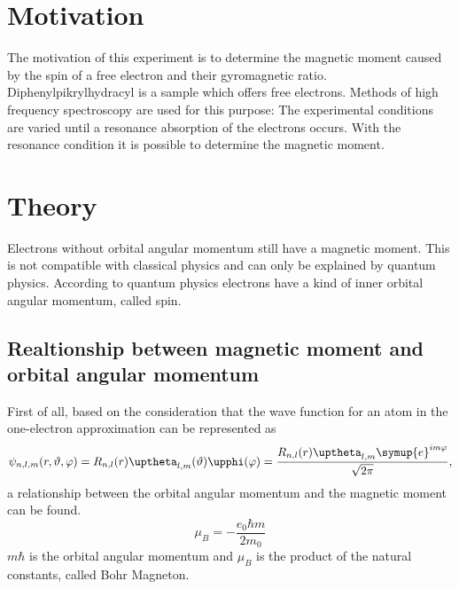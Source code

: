 \section{Motivation}
The motivation of this experiment is to determine the magnetic moment caused by the spin of a free electron and their gyromagnetic ratio.
Diphenylpikrylhydracyl is a sample which offers free electrons. Methods of high frequency spectroscopy are used for this purpose:
The experimental conditions are varied until a resonance absorption of the electrons occurs. With the resonance condition it is possible
to determine the magnetic moment.
\section{Theory}
Electrons without orbital angular momentum still have a magnetic moment. This is not compatible with classical physics
and can only be explained by quantum physics.
According to quantum physics electrons have a kind of inner orbital angular momentum, called spin. \\
\subsection{Realtionship between magnetic moment and orbital angular momentum}
First of all, based on the consideration that the
wave function for an atom in the one-electron approximation can be represented as
\begin{equation}
  \psi_{n,l,m}(r,\vartheta,\varphi)=R_{n,l}(r)\uptheta_{l,m}(\vartheta)\upphi(\varphi)=\frac{R_{n,l}(r)\uptheta_{l,m}\symup{e}^{im\varphi}}{\sqrt{2\pi}},
\end{equation}
a relationship between the orbital angular momentum
and the magnetic moment can be found.
\begin{equation}
  \mu_B=-\frac{e_0\hbar m}{2m_0}
\end{equation}
$m\hbar$ is the orbital angular momentum and $\mu_B$ is the product of the natural constants, called Bohr Magneton.
